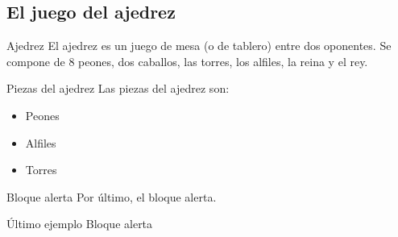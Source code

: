 \documentclass[aspectratio=169]{beamer}
\begin{document}
\subsection{El juego del ajedrez}
\begin{frame}{Ajedrez}
    El ajedrez es un juego de mesa (o de tablero) entre dos oponentes. Se compone de 8 peones, dos caballos, las torres, los alfiles, la reina y el rey.

\begin{exampleblock}{Piezas del ajedrez}
Las piezas del ajedrez son: 
    \begin{itemize}
        \item Peones
        \item Alfiles
        \item Torres
    \end{itemize}
    \end{exampleblock}
\end{frame}


\begin{frame}{Bloque alerta}
    Por último, el bloque alerta.

    \begin{alertblock}{Último ejemplo}
        Bloque alerta
    \end{alertblock}
\end{frame}


\end{document}
